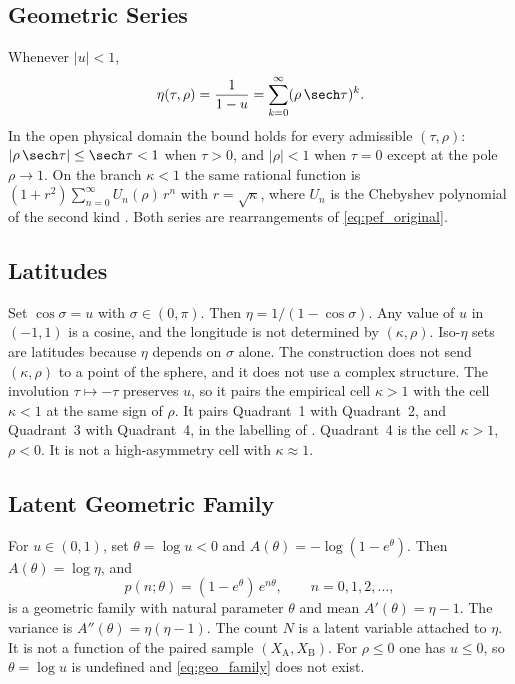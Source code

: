 \subsection{Geometric Series}

Whenever $|u|<1$,
\begin{equation}
  \eta(\tau,\rho) = \frac{1}{1-u} = \sum_{k=0}^{\infty}(\rho\,\sech\tau)^{k}.
  \label{eq:geometric_series}
\end{equation}
In the open physical domain the bound holds for every admissible $(\tau,\rho)$: $|\rho\,\sech\tau| \le \sech\tau < 1$ when $\tau>0$, and $|\rho|<1$ when $\tau = 0$ except at the pole $\rho\to 1$.
On the branch $\kappa<1$ the same rational function is $(1+r^{2})\sum_{n=0}^{\infty} U_{n}(\rho)\, r^{n}$ with $r = \sqrt{\kappa}$, where $U_{n}$ is the Chebyshev polynomial of the second kind \parencite{rivlin1990}.
Both series are rearrangements of \cref{eq:pef_original}.

\subsection{Latitudes}
\label{sec:sphere_remark}

Set $\cos\sigma = u$ with $\sigma\in(0,\pi)$.
Then $\eta = 1/(1-\cos\sigma)$.
Any value of $u$ in $(-1,1)$ is a cosine, and the longitude is not determined by $(\kappa,\rho)$.
Iso-$\eta$ sets are latitudes because $\eta$ depends on $\sigma$ alone.
The construction does not send $(\kappa,\rho)$ to a point of the sphere, and it does not use a complex structure.
The involution $\tau\mapsto-\tau$ preserves $u$, so it pairs the empirical cell $\kappa>1$ with the cell $\kappa<1$ at the same sign of $\rho$.
It pairs Quadrant~1 with Quadrant~2, and Quadrant~3 with Quadrant~4, in the labelling of \textcite{brownPEFempirical}.
Quadrant~4 is the cell $\kappa>1$, $\rho<0$.
It is not a high-asymmetry cell with $\kappa\approx 1$.

\subsection{Latent Geometric Family}
\label{sec:latent_family}

For $u\in(0,1)$, set $\theta = \log u < 0$ and $A(\theta) = -\log(1-e^{\theta})$.
Then $A(\theta) = \log\eta$, and
\begin{equation}
  p(n;\theta) = (1-e^{\theta})\, e^{n\theta}, \qquad n = 0,1,2,\ldots,
  \label{eq:geo_family}
\end{equation}
is a geometric family with natural parameter $\theta$ and mean $A'(\theta) = \eta-1$.
The variance is $A''(\theta) = \eta(\eta-1)$.
The count $N$ is a latent variable attached to $\eta$.
It is not a function of the paired sample $(X_{\mathrm{A}},X_{\mathrm{B}})$.
For $\rho\le 0$ one has $u\le 0$, so $\theta = \log u$ is undefined and \cref{eq:geo_family} does not exist.

